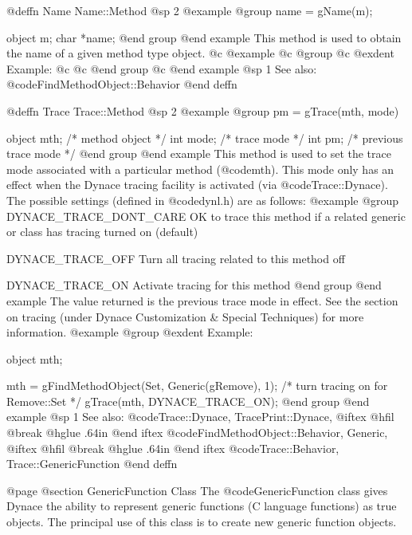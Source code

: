 @deffn {Name} Name::Method
@sp 2
@example
@group
name = gName(m);

object  m;
char    *name;
@end group
@end example
This method is used to obtain the name of a given method type object.
@c @example
@c @group
@c @exdent Example:
@c 
@c @end group
@c @end example
@sp 1
See also:  @code{FindMethodObject::Behavior}
@end deffn














@deffn {Trace} Trace::Method
@sp 2
@example
@group
pm = gTrace(mth, mode)

object  mth;    /*  method object        */
int     mode;   /*  trace mode           */
int     pm;     /*  previous trace mode  */
@end group
@end example
This method is used to set the trace mode associated with a
particular method (@code{mth}).  This mode only has an effect
when the Dynace tracing facility is activated (via
@code{Trace::Dynace}).  The possible settings (defined in
@code{dynl.h}) are as follows:
@example
@group
DYNACE_TRACE_DONT_CARE   OK to trace this method if a
                         related generic or class has tracing
                         turned on (default)

DYNACE_TRACE_OFF         Turn all tracing related to this
                         method off

DYNACE_TRACE_ON          Activate tracing for this method
@end group
@end example
The value returned is the previous trace mode in effect.  See the
section on tracing (under Dynace Customization & Special Techniques) for
more information.
@example
@group
@exdent Example:

object  mth;

mth = gFindMethodObject(Set, Generic(gRemove), 1);
  /* turn tracing on for Remove::Set */
gTrace(mth, DYNACE_TRACE_ON);
@end group
@end example
@sp 1
See also:  @code{Trace::Dynace, TracePrint::Dynace,}
@iftex
@hfil @break @hglue .64in 
@end iftex
@code{FindMethodObject::Behavior, Generic,}
@iftex
@hfil @break @hglue .64in 
@end iftex
@code{Trace::Behavior, Trace::GenericFunction}
@end deffn










@page
@section GenericFunction Class
The @code{GenericFunction} class gives Dynace the ability to represent
generic functions (C language functions) as true objects.  The principal
use of this class is to create new generic function objects.


